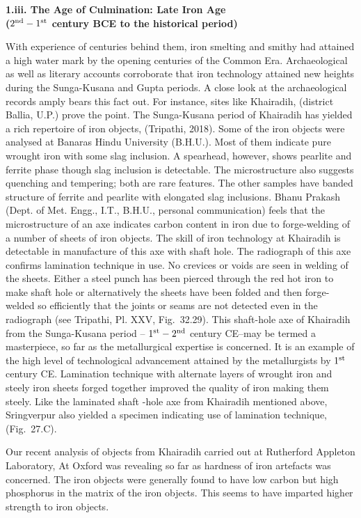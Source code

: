 \textbf{1.iii. The Age of Culmination: Late Iron Age\\ ($2^{\rm nd} -1^{\rm st}$ century BCE to the historical period)}

With experience of centuries behind them, iron smelting and smithy had attained a high water mark by the opening centuries of the Common Era. Archaeological as well as literary accounts corroborate that iron technology attained new heights during the Sunga-Kusana and Gupta periods. A close look at the archaeological records amply bears this fact out. For instance, sites like Khairadih, (district Ballia, U.P.) prove the point. The Sunga-Kusana period of Khairadih has yielded a rich repertoire of iron objects, (Tripathi, 2018). Some of the iron objects were analysed at Banaras Hindu University (B.H.U.). Most of them indicate pure wrought iron with some slag inclusion. A spearhead, however, shows pearlite and ferrite phase though slag inclusion is detectable. The microstructure also suggests quenching and tempering; both are rare features. The other samples have banded structure of ferrite and pearlite with elongated slag inclusions. Bhanu Prakash (Dept. of Met. Engg., I.T., B.H.U., personal communication) feels that the microstructure of an axe indicates carbon content in iron due to forge-welding of a number of sheets of iron objects. The skill of iron technology at Khairadih is detectable in manufacture of this axe with shaft hole. The radiograph of this axe confirms lamination technique in use. No crevices or voids are seen in welding of the sheets. Either a steel punch has been pierced through the red hot iron to make shaft hole or alternatively the sheets have been folded and then forge-welded so efficiently that the joints or seams are not detected even in the radiograph (see Tripathi, Pl. XXV, Fig.~32.29). This shaft-hole axe of Khairadih from the Sunga-Kusana period – $1^{\rm st}  -2^{\rm nd}$ century CE–may be termed a masterpiece, so far as the metallurgical expertise is concerned. It is an example of the high level of technological advancement attained by the metallurgists by $1^{\rm st}$ century CE. Lamination technique with alternate layers of wrought iron and steely iron sheets forged together improved the quality of iron making them steely. Like the laminated shaft -hole axe from Khairadih mentioned above, Sringverpur also yielded a specimen indicating use of lamination technique, (Fig.~27.C).

Our recent analysis of objects from Khairadih carried out at Rutherford Appleton Laboratory, At Oxford was revealing so far as hardness of iron artefacts was concerned. The iron objects were generally found to have low carbon but high phosphorus in the matrix of the iron objects. This seems to have imparted higher strength to iron objects.  

